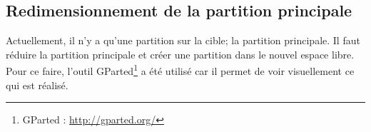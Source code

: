 \documentclass[11pt,a4paper,oneside]{report}
\begin{document}
\subsection{Redimensionnement de la partition principale}
Actuellement, il n'y a qu'une partition sur la cible; la partition principale. Il faut réduire la partition principale et créer une partition dans le nouvel espace libre. Pour ce faire, l'outil GParted\footnote{GParted : \url{http://gparted.org/}} a été utilisé car il permet de voir visuellement ce qui est réalisé.

\begin{figure}[H]
    \hfill


\end{figure}
\end{document}
